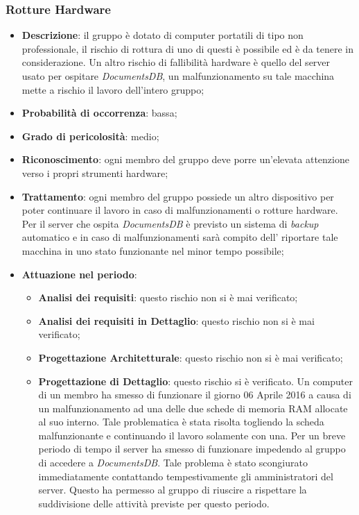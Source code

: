 		\subsubsection{Rotture Hardware}
		\begin{itemize}
			\item \textbf{Descrizione}: il gruppo è dotato di computer portatili di tipo non professionale, il rischio di rottura di uno di questi è possibile ed è da tenere in considerazione. Un altro rischio di fallibilità hardware è quello del server usato per ospitare \textit{DocumentsDB}, un malfunzionamento su tale macchina mette a rischio il lavoro dell'intero gruppo;
			\item \textbf{Probabilità di occorrenza}: bassa;
			\item \textbf{Grado di pericolosità}: medio;
			\item \textbf{Riconoscimento}: ogni membro del gruppo deve porre un'elevata attenzione verso i propri strumenti hardware;	
			\item \textbf{Trattamento}: ogni membro del gruppo possiede un altro dispositivo per poter continuare il lavoro in caso di malfunzionamenti o rotture hardware. Per il server che ospita \textit{DocumentsDB} è previsto un sistema di \textit{backup} automatico e in caso di malfunzionamenti sarà compito dell'\textit{\Amm} riportare tale macchina in uno stato funzionante nel minor tempo possibile;
			\item \textbf{Attuazione nel periodo}:
			\begin{itemize}
				\item \textbf{Analisi dei requisiti}: questo rischio non si è mai verificato;
				\item \textbf{Analisi dei requisiti in Dettaglio}: questo rischio non si è mai verificato;
				\item \textbf{Progettazione Architetturale}: questo rischio non si è mai verificato;
				\item \textbf{Progettazione di Dettaglio}: questo rischio si è verificato. Un computer di un membro ha smesso di funzionare il giorno 06 Aprile 2016 a causa di un malfunzionamento ad una delle due schede di memoria RAM allocate al suo interno. Tale problematica è stata risolta togliendo la scheda malfunzionante e continuando il lavoro solamente con una. Per un breve periodo di tempo il server ha smesso di funzionare impedendo al gruppo di accedere a \textit{DocumentsDB}. Tale problema è stato scongiurato immediatamente contattando tempestivamente gli amministratori del server. 
				Questo ha permesso al gruppo di riuscire a rispettare la suddivisione delle attività previste per questo periodo. 
			\end{itemize}
		\end{itemize}	
	
